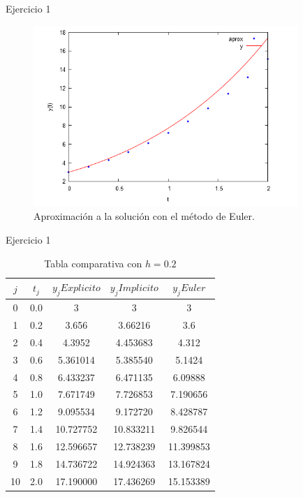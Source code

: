 		\begin{frame}{Ejercicio 1}
			\begin{figure}[h]
				\centering
				\includegraphics[width=10cm]{./Images/ejtp1-1.png}
				\caption{Aproximación a la solución con el método de Euler.}
			\end{figure}	
		\end{frame}		

		\begin{frame}{Ejercicio 1}
				\begin{table}[H]
					\centering
					\begin{tabular}{|| c | c | c | c | c||}
						\hline
						\hline $j$ &  $t_j $ & $y_j Explicito$ & $y_j Implicito$ & $y_j Euler$ \\
						\hline 0 & 0.0 & 3 & 3 & 3 \\
						\hline 1 & 0.2 & 3.656 & 3.66216 & 3.6 \\
						\hline 2 & 0.4 & 4.3952 & 4.453683 & 4.312 \\
						\hline 3 & 0.6 & 5.361014 & 5.385540 & 5.1424 \\
						\hline 4 & 0.8 & 6.433237 & 6.471135 & 6.09888 \\
						\hline 5 & 1.0 & 7.671749 & 7.726853 & 7.190656 \\
						\hline 6 & 1.2 & 9.095534 & 9.172720 & 8.428787 \\
						\hline 7 & 1.4 & 10.727752 & 10.833211 & 9.826544 \\
						\hline 8 & 1.6 & 12.596657 & 12.738239 & 11.399853 \\
						\hline 9 & 1.8 & 14.736722 & 14.924363 & 13.167824 \\
						\hline 10 & 2.0 & 17.190000 & 17.436269 & 15.153389 \\
						\hline
						\hline
					\end{tabular}
					\caption{Tabla comparativa con $h=0.2$}
				\end{table}	
		\end{frame}
		
